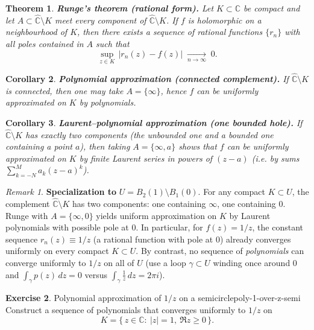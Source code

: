 \documentclass[11pt,a4paper]{article}
\newtheorem{theorem}{Theorem}
\newtheorem{corollary}[theorem]{Corollary}
\theoremstyle{definition}
\newtheorem{exercise}{Exercise} %
\theoremstyle{definition}
\theoremstyle{plain}
\theoremstyle{remark}
\newtheorem{remark}[exercise]{Remark}
\begin{document}
\begin{theorem}
	\textbf{Runge’s theorem (rational form).}
	Let $K\subset\mathbb C$ be compact and let $A\subset\widehat{\mathbb C}\setminus K$
	meet every component of $\widehat{\mathbb C}\setminus K$.
	If $f$ is holomorphic on a neighbourhood of $K$, then there exists a sequence of
	rational functions $\{r_n\}$ with all poles contained in $A$ such that
	\[
	\sup_{z\in K}\,|r_n(z)-f(z)|\;\xrightarrow[n\to\infty]{}\;0.
	\]
\end{theorem}

\begin{corollary}
	\textbf{Polynomial approximation (connected complement).}
	If $\widehat{\mathbb C}\setminus K$ is connected, then one may take $A=\{\infty\}$,
	hence $f$ can be uniformly approximated on $K$ by polynomials.
\end{corollary}

\begin{corollary}
	\textbf{Laurent–polynomial approximation (one bounded hole).}
	If $\widehat{\mathbb C}\setminus K$ has exactly two components (the unbounded one
	and a bounded one containing a point $a$), then taking $A=\{\infty,a\}$ shows that
	$f$ can be uniformly approximated on $K$ by finite Laurent series in powers of
	$(z-a)$ (i.e. by sums $\sum_{k=-N}^{M} a_k (z-a)^k$).
\end{corollary}

\begin{remark}
	\textbf{Specialization to }$U=B_2(1)\setminus B_1(0)$. 
	For any compact $K\subset U$, the complement $\widehat{\mathbb C}\setminus K$
	has two components: one containing $\infty$, one containing $0$.
	Runge with $A=\{\infty,0\}$ yields uniform approximation on $K$ by
	Laurent polynomials with possible pole at $0$. In particular, for $f(z)=1/z$,
	the constant sequence $r_n(z)\equiv 1/z$ (a rational function with pole at $0$)
	already converges uniformly on every compact $K\subset U$.
	By contrast, no sequence of \emph{polynomials} can converge uniformly to $1/z$
	on all of $U$ (use a loop $\gamma\subset U$ winding once around $0$ and
	$\int_\gamma p(z)\,dz=0$ versus $\int_\gamma \frac{1}{z}\,dz=2\pi i$).
\end{remark}

\begin{exercise}{Polynomial approximation of $1/z$ on a semicircle}{poly-1-over-z-semi}
	Construct a sequence of polynomials that converges uniformly to $1/z$ on
	\[
	K=\{\,z\in\mathbb C:\ |z|=1,\ \Re z\ge 0\,\}.
	\]
\end{exercise}
\end{document}
